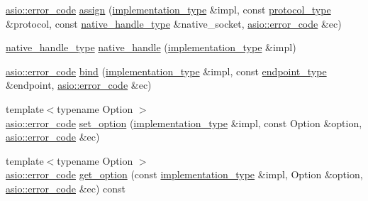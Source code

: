 \begin{DoxyCompactItemize}
\item 
\hyperlink{classasio_1_1error__code}{asio\+::error\+\_\+code} \hyperlink{classasio_1_1detail_1_1reactive__socket__service_a1ef53ac8f7e26155dfb119362710838d}{assign} (\hyperlink{structasio_1_1detail_1_1reactive__socket__service_1_1implementation__type}{implementation\+\_\+type} \&impl, const \hyperlink{classasio_1_1detail_1_1reactive__socket__service_a622bd8618dbd40771a5b6a66eb1b75e9}{protocol\+\_\+type} \&protocol, const \hyperlink{classasio_1_1detail_1_1reactive__socket__service_a2fc869359f3eb7b6f25925f10e594e1d}{native\+\_\+handle\+\_\+type} \&native\+\_\+socket, \hyperlink{classasio_1_1error__code}{asio\+::error\+\_\+code} \&ec)
\item 
\hyperlink{classasio_1_1detail_1_1reactive__socket__service_a2fc869359f3eb7b6f25925f10e594e1d}{native\+\_\+handle\+\_\+type} \hyperlink{classasio_1_1detail_1_1reactive__socket__service_a7cea1a4725489ff49b829ee098207c61}{native\+\_\+handle} (\hyperlink{structasio_1_1detail_1_1reactive__socket__service_1_1implementation__type}{implementation\+\_\+type} \&impl)
\item 
\hyperlink{classasio_1_1error__code}{asio\+::error\+\_\+code} \hyperlink{classasio_1_1detail_1_1reactive__socket__service_ae4a398bc06b4b3fad98097ad7480287a}{bind} (\hyperlink{structasio_1_1detail_1_1reactive__socket__service_1_1implementation__type}{implementation\+\_\+type} \&impl, const \hyperlink{classasio_1_1detail_1_1reactive__socket__service_adad302be53c8a4ea6e7693bc88595381}{endpoint\+\_\+type} \&endpoint, \hyperlink{classasio_1_1error__code}{asio\+::error\+\_\+code} \&ec)
\item 
{\footnotesize template$<$typename Option $>$ }\\\hyperlink{classasio_1_1error__code}{asio\+::error\+\_\+code} \hyperlink{classasio_1_1detail_1_1reactive__socket__service_a495910f2434379a5e459402daea5a444}{set\+\_\+option} (\hyperlink{structasio_1_1detail_1_1reactive__socket__service_1_1implementation__type}{implementation\+\_\+type} \&impl, const Option \&option, \hyperlink{classasio_1_1error__code}{asio\+::error\+\_\+code} \&ec)
\item 
{\footnotesize template$<$typename Option $>$ }\\\hyperlink{classasio_1_1error__code}{asio\+::error\+\_\+code} \hyperlink{classasio_1_1detail_1_1reactive__socket__service_aba36dc4c7810edd824590da15f81ddce}{get\+\_\+option} (const \hyperlink{structasio_1_1detail_1_1reactive__socket__service_1_1implementation__type}{implementation\+\_\+type} \&impl, Option \&option, \hyperlink{classasio_1_1error__code}{asio\+::error\+\_\+code} \&ec) const 

\end{DoxyCompactItemize}
